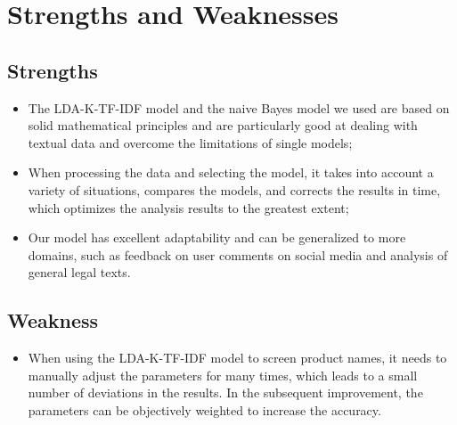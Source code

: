 \documentclass[12pt]{mcmthesis}
\begin{document}


\section{Strengths and Weaknesses}
\subsection{Strengths}
\begin{itemize}
\item The LDA-K-TF-IDF model and the naive Bayes model we used are based on solid mathematical principles and are particularly good at dealing with textual data and overcome the limitations of single models;
\item When processing the data and selecting the model, it takes into account a variety of situations, compares the models, and corrects the results in time, which optimizes the analysis results to the greatest extent;
\item Our model has excellent adaptability and can be generalized to more domains, such as feedback on user comments on social media and analysis of general legal texts.
\end{itemize}
\subsection{Weakness}
\begin{itemize}
	\item When using the LDA-K-TF-IDF model to screen product names, it needs to manually adjust the parameters for many times, which leads to a small number of deviations in the results. In the subsequent improvement, the parameters can be objectively weighted to increase the accuracy.
\end{itemize}
\end{document}
